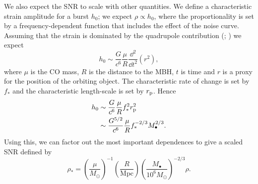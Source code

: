 We also expect the SNR to scale with other quantities. We define a characteristic strain amplitude for a burst $h_0$; we expect $\rho \propto h_0$, where the proportionality is set by a frequency-dependent function that includes the effect of the noise curve. Assuming that the strain is dominated by the quadrupole contribution (\citealt[section 36.10]{Misner1973}; \citealt[section 17.9]{Hobson2006}) we expect
\begin{equation}
h_0 \sim \dfrac{G}{c^6}\dfrac{\mu}{R}\dfrac{\dd^2}{\dd t^2}\left(r^2\right),
\end{equation}
where $\mu$ is the CO mass, $R$ is the distance to the MBH, $t$ is time and $r$ is a proxy for the position of the orbiting object. The characteristic rate of change is set by $f_\ast$ and the characteristic length-scale is set by $r_\mathrm{p}$. Hence
\begin{align}
h_0 \sim {} & \dfrac{G}{c^6}\dfrac{\mu}{R}f_\ast^2 r_\mathrm{p}^2 \\
 \sim {} & \dfrac{G^{5/2}}{c^6}\dfrac{\mu}{R}f_\ast^{-2/3}M_\bullet^{2/3}.
\end{align}
Using this, we can factor out the most important dependences to give a scaled SNR defined by
\begin{equation}
\rho_\ast = \left(\dfrac{\mu}{M_\odot}\right)^{-1}\left(\dfrac{R}{\mathrm{Mpc}}\right)\left(\dfrac{M_\bullet}{10^6 M_\odot}\right)^{-2/3}\rho.
\label{eq:SNR-scaling}
\end{equation}


